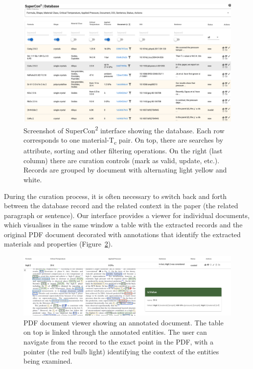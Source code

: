 \begin{figure}[htbp]
  \centering
  \includegraphics[width=1\textwidth]{figures/curation/supercon-curation-database.png} 
  \caption{Screenshot of SuperCon\textsuperscript{2} interface showing the database. Each row corresponds to one material-T\textsubscript{c} pair. On top, there are searches by attribute, sorting and other filtering operations. On the right (last column) there are curation controls (mark as valid, update, etc.).   Records are grouped by document with alternating light yellow and white. }
  \label{fig:curation-interface-database}
\end{figure}

During the curation process, it is often necessary to switch back and forth between the database record and the related context in the paper (the related paragraph or sentence). 
Our interface provides a viewer for individual documents, which visualises in the same window a table with the extracted records and the original PDF document decorated with annotations that identify the extracted materials and properties (Figure~\ref{fig:pdf-view}). 

\begin{figure}[htbp]
  \centering
  \includegraphics[width=1\textwidth]{figures/curation/pdf-view-context.png} 
  \caption{PDF document viewer showing an annotated document. The table on top is linked through the annotated entities. The user can navigate from the record to the exact point in the PDF, with a pointer (the red bulb light) identifying the context of the entities being examined. }
  \label{fig:pdf-view}
\end{figure}

